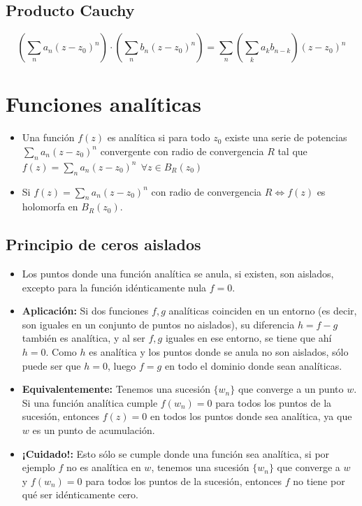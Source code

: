\documentclass[paper=a4, fontsize=11pt]{scrartcl}
\numberwithin{equation}{section}
\numberwithin{figure}{section}
\numberwithin{table}{section}
\begin{document}
\subsection{Producto Cauchy}
$$\left(\sum_n a_n(z-z_0)^n\right)\cdot\left(\sum_n b_n(z-z_0)^n\right) = \sum_n\left(\sum_k a_kb_{n-k}\right)(z-z_0)^n$$

\newpage
\section{Funciones analíticas}
\begin{itemize}
\item Una función $f(z)$ es analítica si para todo $z_0$ existe una serie de potencias $\sum_n a_n(z-z_0)^n$  convergente con radio de convergencia $R$ tal que $\boxed{f(z) =\sum_n a_n(z-z_0)^n\ \ \forall z \in B_R(z_0)}$
\item Si $f(z)=\sum_n a_n(z-z_0)^n$ con radio de convergencia $R \iff f(z)$ es holomorfa en $B_R(z_0)$.
\end{itemize}

\subsection{Principio de ceros aislados}
\begin{itemize}
\item Los puntos donde una función analítica se anula, si existen, son aislados, excepto para la función idénticamente nula $f=0$.
\item \textbf{Aplicación:} Si dos funciones $f,g$ analíticas coinciden en un entorno (es decir, son iguales en un conjunto de puntos no aislados), su diferencia $h=f-g$ también es analítica, y al ser $f,g$ iguales en ese entorno, se tiene que ahí $h=0$. Como $h$ es analítica y los puntos donde se anula no son aislados, sólo puede ser que $h=0$, luego $f=g$ en todo el dominio donde sean analíticas.
\item \textbf{Equivalentemente:} Tenemos una sucesión $\{w_n\}$ que converge a un punto $w$. Si una función analítica cumple $f(w_n) = 0$ para todos los puntos de la sucesión, entonces $f(z)=0$ en todos los puntos donde sea analítica, ya que $w$ es un punto de acumulación.
\item \textbf{¡Cuidado!:} Esto sólo se cumple donde una función sea analítica, si por ejemplo $f$ no es analítica en $w$, tenemos una sucesión $\{w_n\}$ que converge a $w$ y $f(w_n) = 0$ para todos los puntos de la sucesión, entonces $f$ no tiene por qué ser idénticamente cero.
\end{itemize}
\end{document}
